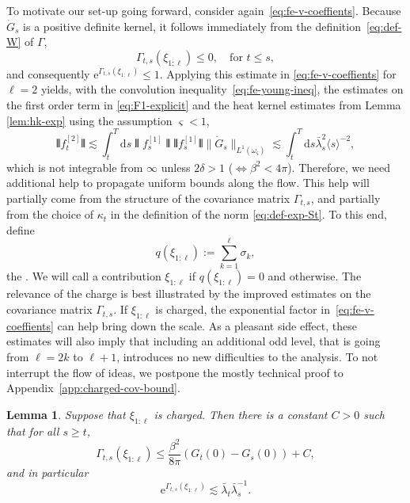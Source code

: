 \documentclass[11pt, a4paper]{scrartcl}
\numberwithin{equation}{section}
\theoremstyle{plain}
\newtheorem{lemma}[foo]{Lemma}
\theoremstyle{remark}
\newcommand{\assign}{:=}
\newcommand{\mathd}{\mathrm{d}}
\newcommand{\mathe}{\mathrm{e}}
\newcommand{\tmtextit}[1]{\text{{\itshape{#1}}}}
\begin{document}
To motivate our set-up going forward, consider
again~\eqref{eq:fe-v-coeffients}. Because $\dot{G}_s$ is a positive definite
kernel, it follows immediately from the definition~\eqref{eq:def-W} of $\Gamma$,
\begin{equation}
  \Gamma_{t, s} (\xi_{1 : \ell}) \leqslant 0 \label{eq:W-leq-0}, \quad \text{for }
  t \leqslant s,
\end{equation}
and consequently $\mathe^{\Gamma_{t, s} (\xi_{1 : \ell})} \leqslant 1$. Applying
this estimate in \eqref{eq:fe-v-coeffients} for $\ell = 2$ yields, with the
convolution inequality~\eqref{eq:fe-young-ineq}, the estimates on the first
order term in \eqref{eq:F1-explicit} and the heat kernel estimates from Lemma
\ref{lem:hk-exp} using the assumption $\varsigma < 1$,
\[ \interleave f^{[2]}_t \interleave \lesssim \int_t^T \mathd s \interleave
   f_s^{[1]} \interleave  \interleave f_s^{[1]} \interleave  \| \dot{G}_s
   \|_{L^1 (\omega_{\varsigma})} \lesssim \int_t^T \mathd s \bar{\lambda}_s^2
   \langle s \rangle^{- 2}, \]
which is not integrable from $\infty$ unless $2 \delta > 1$ ($\Leftrightarrow
\beta^2 < 4 \pi$). Therefore, we need additional help to propagate uniform
bounds along the flow. This help will partially come from the structure of the
covariance matrix $\Gamma_{t, s}$, and partially from the choice of $\kappa_t$ in the
definition of the norm \eqref{eq:def-exp-St}. To this end, define
\[ q (\xi_{1 : \ell}) \assign \sum^{\ell}_{k = 1} \sigma_k, \]
the \tmtextit{charge of $\xi_{1 : \ell}$}. We will call a contribution $\xi_{1
: \ell}$ \tmtextit{neutral} if $q (\xi_{1 : \ell}) = 0$ and \tmtextit{charged}
otherwise. The relevance of the charge is best illustrated by the improved
estimates on the covariance matrix $\Gamma_{t, s}$. If $\xi_{1 : \ell}$ is
charged, the exponential factor in~\eqref{eq:fe-v-coeffients} can help bring
down the scale. As a pleasant side effect, these estimates will also imply
that including an additional odd level, that is going from $\ell = 2 k$ to
$\ell + 1$, introduces no new difficulties to the analysis. To not
interrupt the flow of ideas, we postpone the mostly technical proof to
Appendix~\ref{app:charged-cov-bound}.

\begin{lemma}
  \label{lem:charged-cov-bound} Suppose that $\xi_{1 : \ell}$ is charged. Then
  there is a constant $C > 0$ such that for all $s \geqslant t$,
  \begin{equation}
    \Gamma_{t, s} (\xi_{1 : \ell}) \leqslant \frac{\beta^2}{8 \pi} (G_t (0) - G_s
    (0)) + C \label{eq:charged-cov-bound},
  \end{equation}
  and in particular
  \[ \mathe^{\Gamma_{t, s} (\xi_{1 : \ell})} \lesssim \bar{\lambda}_t \bar{\lambda}_s^{- 1} .
  \]
\end{lemma}
\end{document}
